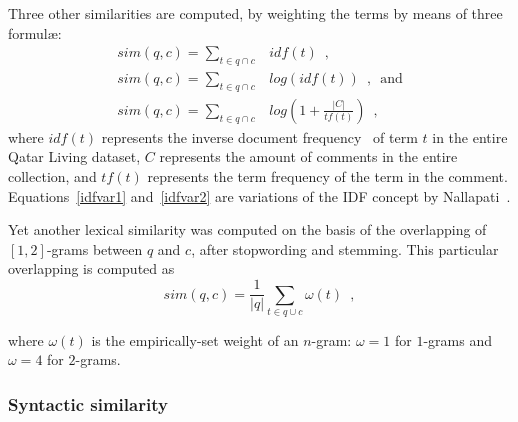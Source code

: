 Three other similarities are computed, by weighting the terms by means of three 
formul\ae: 
%
\begin{eqnarray}
 sim(q, c)=\sum_{t\in q\cap c} & idf(t) \enspace,		\\
 sim(q, c)=\sum_{t\in q\cap c} & log(idf(t)) \enspace, \enspace \mathrm{and} 
\label{idfvar1}\\
 sim(q, c)=\sum_{t\in q\cap c} & log\left(1 + \frac{|C|}{tf(t)}\right) \enspace 
,
\label{idfvar2}
\end{eqnarray}
% 
where $idf(t)$ represents the inverse document frequency~\cite{Jones:1972} of 
term $t$ in the entire Qatar Living dataset, $C$ represents the amount of 
comments in the entire collection, and $tf(t)$ represents the term frequency of 
the term in the comment. Equations~\ref{idfvar1} and~\ref{idfvar2} are 
variations of the IDF concept by Nallapati~.




Yet another lexical similarity was computed on the basis of the overlapping of 
$[1, 2]$-grams between $q$ and $c$, after stopwording and stemming. This 
particular overlapping is computed as
%
\begin{equation}
 sim(q,c) = \frac{1}{|q|} \sum_{t\in q\cup c} \omega(t) \enspace ,
 \label{eq:overlap}
\end{equation}
% 

where $\omega(t)$ is the empirically-set weight of an $n$-gram: $\omega = 1$ for 
$1$-grams and $\omega = 4$ for $2$-grams.




\subsubsection{Syntactic similarity }
\label{sub:syntactic}


